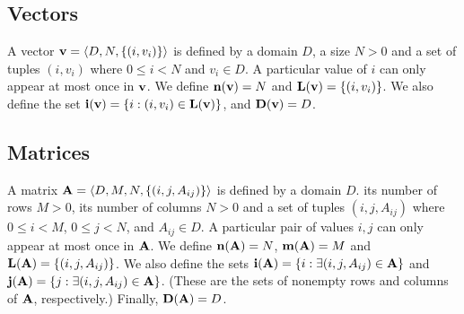 \subsection{Vectors}

 

A vector ${\bf v} = \langle D, N, \{ (i,v_i) \} \rangle$ is defined
by a domain $D$, a size $N>0$ and a set of tuples $(i,v_i)$ where
$0 \leq i < N$ and $v_i \in D$. A particular value of $i$ can only
appear at most once in ${\bf v}$. We define $\bold{n}({\bf v}) =
N$ and $\bold{L}({\bf v}) = \{ (i,v_i) \}$. We also define the set
${\bf i({\bf v})} = \{ i : (i,v_i) \in \bold{L}({\bf v}) \}$,
and $\bold{D}({\bf v}) = D$.



\subsection{Matrices}
\label{Sec:Matrices}


A matrix ${\bf A} = \langle D, M, N,  \{ (i,j,A_{ij}) \} \rangle$ is
defined by a domain $D$. its number of rows $M>0$, its number of columns
$N>0$ and a set of tuples $(i,j,A_{ij})$ where $0 \leq i < M$, $0 \leq
j < N$, and $A_{ij} \in D$. A particular pair of values $i,j$ can only
appear at most once in ${\bf A}$. We define $\bold{n}({\bf A})
= N$,  $\bold{m}({\bf A}) = M$ and $\bold{L}({\bf A}) = \{
(i,j,A_{ij}) \}$.  We also define the sets ${\bf i({\bf A})} = \{
i : \exists (i,j,A_{ij}) \in {\bf A} \}$ and ${\bf j({\bf A})}
= \{ j : \exists (i,j,A_{ij}) \in {\bf A} \}$.  (These are the sets
of nonempty rows and columns of ${\bf A}$, respectively.)  Finally,
$\bold{D}({\bf A}) = D$.


